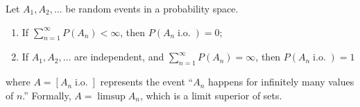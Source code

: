 \documentclass[12pt]{article}
\begin{document}
Let $A_1, A_2,\dots$ be random events in a probability space.

\begin{enumerate}
\item If $\sum_{n=1}^\infty P(A_n)<\infty$, then 
$P(A_n \operatorname{i.o.}) = 0$;

\item If $A_1,A_2,\dots$ are independent, and $\sum_{n=1}^\infty P(A_n)=\infty$,
then $P(A_n \operatorname{i.o.})=1$
\end{enumerate}

where $A=[A_n \operatorname{i.o.}]$ represents the event ``$A_n$ happens for infinitely many values of $n$.'' 
Formally, $A = \limsup A_n$, which is a limit superior of sets.
\end{document}
